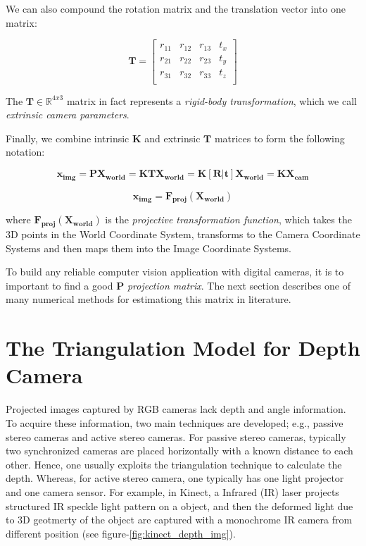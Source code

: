 \documentclass[a4paper]{report}
\numberwithin{figure}{section}
\newcommand{\R}{\mathbb{R}}
\begin{document}
We can also compound the rotation matrix and the translation vector into 
one matrix:

\begin{equation}
  \mathbf{T} =
  \begin{bmatrix}
    r_{11} & r_{12} & r_{13} & t_x\\
    r_{21} & r_{22} & r_{23} & t_y\\
    r_{31} & r_{32} & r_{33} & t_z\\
  \end{bmatrix}
\end{equation} \label{eq:transformation_matrix}

The $\mathbf{T} \in \R^{4x3}$ matrix in fact represents 
a \textit{rigid-body transformation}, which we call 
\textit{extrinsic camera parameters}.

Finally, we combine intrinsic $\mathbf{K}$ and 
extrinsic $\mathbf{T}$ matrices to form the following notation: 

\begin{equation}
  \mathbf{x_{img}} = 
  \mathbf{P}\mathbf{X_{world}} = 
  \mathbf{K}\mathbf{T}\mathbf{X_{world}} = 
  \mathbf{K}[\mathbf{R}|\mathbf{t}]\mathbf{X_{world}} =
  \mathbf{K}\mathbf{X_{cam}}
\end{equation} \label{eq:simplyfied_proj_func_1}

\begin{equation}
  \mathbf{x_{img}} = \mathbf{F_{proj}}(\mathbf{X_{world}})
\end{equation} \label{eq:simplyfied_proj_func_2}

where $\mathbf{F_{proj}}(\mathbf{X_{world}})$ is the 
\textit{projective transformation function}, which takes 
the 3D points in the World Coordinate System, transforms to 
the Camera Coordinate Systems and then maps them into the Image 
Coordinate Systems.

To build any reliable computer vision application with digital cameras, it is 
to important to find a good $\mathbf{P}$ \textit{projection matrix}. 
The next section describes one of many numerical methods for estimationg this 
matrix in literature.

\section{The Triangulation Model for Depth Camera} \label{sc_depth_model}

Projected images captured by RGB cameras lack depth and angle 
information. To acquire these information, two main techniques are developed; 
e.g., passive stereo cameras and active stereo cameras. For passive stereo cameras, 
typically two synchronized cameras are placed horizontally with a known distance to each other. 
Hence, one usually exploits the triangulation technique to calculate the depth. 
Whereas, for active stereo camera, one typically has one light projector and 
one camera sensor. For example, in Kinect, a Infrared (IR) laser projects 
structured IR speckle light pattern on a object, and then 
the deformed light due to 3D geotmerty of the object are 
captured with a monochrome IR camera from different 
position (see figure-\ref{fig:kinect_depth_img}). 
\end{document}
